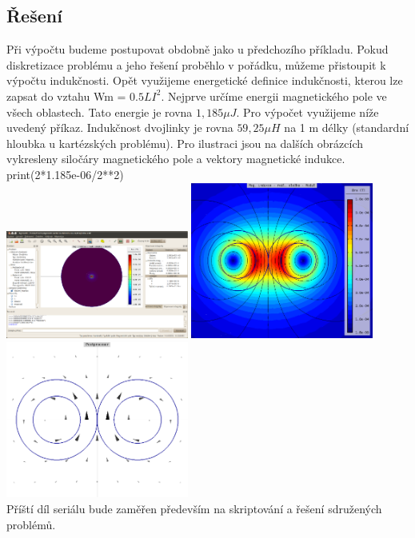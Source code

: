 \documentclass[a4paper, oneside]{article}
\begin{document}
\subsection{Řešení}
Při výpočtu budeme postupovat obdobně jako u předchozího příkladu. Pokud diskretizace problému a jeho řešení proběhlo v pořádku, můžeme přistoupit k výpočtu indukčnosti. Opět využijeme energetické definice indukčnosti, kterou lze zapsat do vztahu Wm = $0.5 LI^2$. Nejprve určíme energii magnetického pole ve všech oblastech. Tato energie je rovna $1,185 \mu J$. Pro výpočet využijeme níže uvedený příkaz. Indukčnost dvojlinky je rovna $59,25 \mu H$ na 1 m délky (standardní hloubka u kartézských problému). Pro ilustraci jsou na dalších obrázcích vykresleny siločáry magnetického pole a vektory magnetické indukce.\\
print(2*1.185e-06/2**2)\\
\includegraphics[width=6cm]{Vypocet_indukcnosti.eps}
\includegraphics[width=6cm]{Silocary.eps}\\
\includegraphics[width=6cm]{Vektory.eps}\\
Příští díl seriálu bude zaměřen především na skriptování a řešení sdružených problémů.\\
\end{document}
